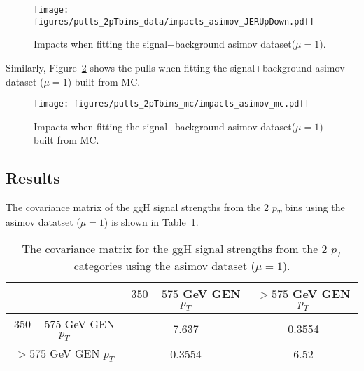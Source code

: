 \begin{figure}[hbtp]
\centering
\texttt{[image: figures/pulls\_2pTbins\_data/impacts\_asimov\_JERUpDown.pdf]}
 \caption{Impacts when fitting the signal+background asimov dataset($\mu=1$).}
 \label{fig:Pulls2pTbins}
 \end{figure}

Similarly, Figure~\ref{fig:Pulls2pTbinsMC} shows the pulls when fitting the signal+background asimov dataset ($\mu=1$) built from MC.

\begin{figure}[hbtp]
\centering
\texttt{[image: figures/pulls\_2pTbins\_mc/impacts\_asimov\_mc.pdf]}
 \caption{Impacts when fitting the signal+background asimov dataset($\mu=1$) built from MC.}
 \label{fig:Pulls2pTbinsMC}
 \end{figure}

\subsection{Results}
The covariance matrix of the ggH signal strengths from the 2 $p_{T}$ bins using the asimov datatset ($\mu=1$) is shown in Table~\ref{tab:CovarianceMatrix}.

\begin{table}[htbp]
\centering
  \begin{tabular}{ccc}
  \hline
   & $350 - 575$ GeV GEN $p_{T}$ & $> 575$ GeV GEN $p_{T}$\\
  \hline
$350 - 575$ GeV GEN $p_{T}$ & 7.637   & 0.3554 \\
$>575$ GeV GEN $p_{T}$      & 0.3554  & 6.52   \\
  \hline
  \end{tabular}
  \caption{The covariance matrix for the ggH signal strengths from the 2 $p_{T}$ categories using the asimov dataset ($\mu=1$).} \label{tab:CovarianceMatrix}
\end{table}

